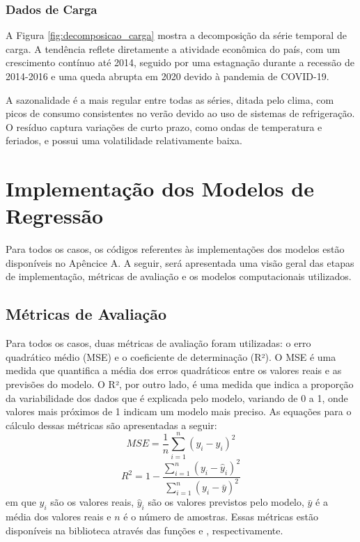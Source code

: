 \subsubsection{Dados de Carga} %
\begin{figure}[!ht]
  {}
  {}
\end{figure}
A Figura \ref{fig:decomposicao_carga} mostra a decomposição da série temporal de carga. A tendência
reflete diretamente a atividade econômica do país, com um crescimento contínuo até 2014, seguido por uma estagnação durante 
a recessão de 2014-2016 e uma queda abrupta em 2020 devido à pandemia de COVID-19. \cite{Magazzino2021}

A sazonalidade é a mais regular entre todas as séries, ditada pelo clima, com picos de consumo consistentes no verão devido 
ao uso de sistemas de refrigeração. O resíduo captura variações de curto prazo, como ondas de temperatura e feriados, e 
possui uma volatilidade relativamente baixa.


\section{Implementação dos Modelos de Regressão} %
Para todos os casos, os códigos referentes às implementações dos modelos estão disponíveis no Apêncice A. A seguir, será
apresentada uma visão geral das etapas de implementação, métricas de avaliação e os modelos computacionais utilizados.

\subsection{Métricas de Avaliação} %
Para todos os casos, duas métricas de avaliação foram utilizadas: o erro quadrático médio (MSE) e o coeficiente de determinação (R²).
O MSE é uma medida que quantifica a média dos erros quadráticos entre os valores reais e as previsões do modelo. O R², por outro lado, 
é uma medida que indica a proporção da variabilidade dos dados que é explicada pelo modelo, variando de 0 a 1, onde valores mais 
próximos de 1 indicam um modelo mais preciso. As equações para o cálculo dessas métricas são apresentadas a seguir:
\begin{equation}
    \label{eq:mse}
    MSE = \frac{1}{n} \sum_{i=1}^{n} (y_i - \hat{y}_i)^2
\end{equation}
\begin{equation}
    \label{eq:r2}
    R^2 = 1 - \frac{\sum_{i=1}^{n} (y_i - \hat{y}_i)^2}{\sum_{i=1}^{n} (y_i - \bar{y})^2}
\end{equation}
em que $ y_i $ são os valores reais, $ \hat{y}_i $ são os valores previstos pelo modelo, $ \bar{y} $ é a média dos valores 
reais e $ n $ é o número de amostras. Essas métricas estão disponíveis na biblioteca  através das
funções  e , respectivamente.

